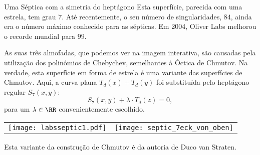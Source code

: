 \begin{surferPage}{Uma S\'eptica com a simetria do hept\'agono}
    Esta superf\'icie, parecida com uma estrela, tem grau $7$.  
    At\'e recentemente, o seu n\'umero de singularidades, $84$, ainda era o n\'umero m\'aximo conhecido para as s\'epticas.
    Em 2004, Oliver Labs melhorou o recorde mundial para $99$.
  
  
 As suas tr\^es almofadas, que podemos ver na imagem interativa, 
    s\~ao causadas pela utiliza\c c\~ao dos polin\'omios de Chebychev, semelhantes \`a \' Octica de Chmutov. 
    Na verdade, esta superf\'icie em forma de estrela \'e uma variante das superf\'icies de Chmutov.
    Aqui, a curva plana $T_d(x)+T_d(y)$ foi substitu\'ida pelo hept\'agono regular
    $S_7(x,y)$: 
   \[S_7(x,y) + \lambda \cdot T_d(z) = 0,\]
    para um $\lambda\in\RR$ convenientemente escolhido. 
    \vspace*{-0.3em}
    \begin{center}
      \begin{tabular}{c@{\qquad}c}
        \texttt{[image: labsseptic1.pdf]}
        &
        \texttt{[image: septic\_7eck\_von\_oben]}
      \end{tabular}
    \end{center}
    \vspace*{-0.3em}   
   Esta variante da constru\c c\~ao de Chmutov \'e da autoria de Duco van Straten.
\end{surferPage}
